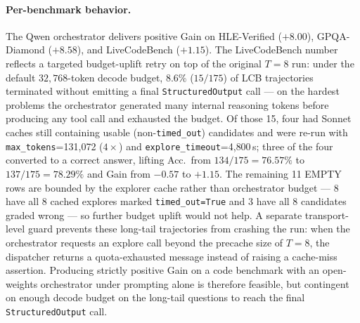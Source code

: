 \paragraph{Per-benchmark behavior.} The Qwen orchestrator delivers positive Gain on HLE-Verified ($+8.00$), GPQA-Diamond ($+8.58$), and LiveCodeBench ($+1.15$). The LiveCodeBench number reflects a targeted budget-uplift retry on top of the original $T{=}8$ run: under the default $32{,}768$-token decode budget, $8.6\%$ ($15/175$) of LCB trajectories terminated without emitting a final \texttt{StructuredOutput} call --- on the hardest problems the orchestrator generated many internal reasoning tokens before producing any tool call and exhausted the budget. Of those 15, four had Sonnet caches still containing usable (non-\texttt{timed\_out}) candidates and were re-run with \texttt{max\_tokens}{=}131{,}072 ($4{\times}$) and \texttt{explore\_timeout}{=}4{,}800\,s; three of the four converted to a correct answer, lifting Acc.\ from $134/175 = 76.57\%$ to $137/175 = 78.29\%$ and Gain from $-0.57$ to $+1.15$. The remaining 11 EMPTY rows are bounded by the explorer cache rather than orchestrator budget --- 8 have all 8 cached explores marked \texttt{timed\_out=True} and 3 have all 8 candidates graded wrong --- so further budget uplift would not help. A separate transport-level guard prevents these long-tail trajectories from crashing the run: when the orchestrator requests an explore call beyond the precache size of $T{=}8$, the dispatcher returns a quota-exhausted message instead of raising a cache-miss assertion. Producing strictly positive Gain on a code benchmark with an open-weights orchestrator under prompting alone is therefore feasible, but contingent on enough decode budget on the long-tail questions to reach the final \texttt{StructuredOutput} call.
